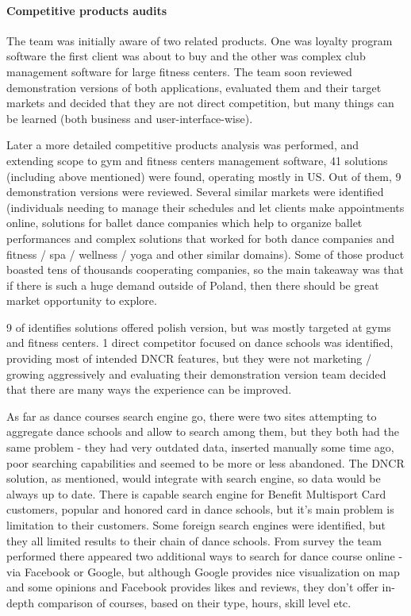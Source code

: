 \documentclass{article}
\begin{document}
\paragraph{Competitive products audits}
The team was initially aware of two related products. One was loyalty program software the first client was about to buy and the other was complex club management software for large fitness centers. The team soon reviewed demonstration versions of both applications, evaluated them and their target markets and decided that they are not direct competition, but many things can be learned (both business and user-interface-wise).

Later a more detailed competitive products analysis was performed, and extending scope to gym and fitness centers management software, 41 solutions (including above mentioned) were found, operating mostly in US. Out of them, 9 demonstration versions were reviewed. Several similar markets were identified (individuals needing to manage their schedules and let clients make appointments online, solutions for ballet dance companies which help to organize ballet performances and complex solutions that worked for both dance companies and fitness / spa / wellness / yoga and other similar domains). Some of those product boasted tens of thousands cooperating companies, so the main takeaway was that if there is such a huge demand outside of Poland, then there should be great market opportunity to explore.

9 of identifies solutions offered polish version, but was mostly targeted at gyms and fitness centers. 1 direct competitor focused on dance schools was identified, providing most of intended DNCR features, but they were not marketing / growing aggressively and evaluating their demonstration version team decided that there are many ways the experience can be improved.

As far as dance courses search engine go, there were two sites attempting to aggregate dance schools and allow to search among them, but they both had the same problem - they had very outdated data, inserted manually some time ago, poor searching capabilities and seemed to be more or less abandoned. The DNCR solution, as mentioned, would integrate with search engine, so data would be always up to date. There is capable search engine for Benefit Multisport Card customers, popular and honored card in dance schools, but it's main problem is limitation to their customers. Some foreign search engines were identified, but they all limited results to their chain of dance schools. From survey the team performed there appeared two additional ways to search for dance course online - via Facebook or Google, but although Google provides nice visualization on map and some opinions and Facebook provides likes and reviews, they don't offer in-depth comparison of courses, based on their type, hours, skill level etc.
\end{document}
